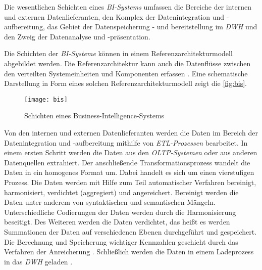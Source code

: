 Die wesentlichen Schichten eines \textit{\acrshort{BI}-Systems} umfassen die Bereiche der internen und externen Datenlieferanten, den Komplex der Datenintegration und -aufbereitung, 
das Gebiet der Datenspeicherung - und bereitstellung im \textit{\acrlong{DWH}} und den Zweig der Datenanalyse und -präsentation\cites[vgl.][126 ff.]{linden_geschaftsmodellbasierte_2016}[vgl.][8]{kemper_business_2010}. 

Die Schichten der \textit{\acrshort{BI}-Systeme} können in einem Referenzarchitekturmodell abgebildet werden. 
Die Referenzarchitektur kann auch die Datenflüsse zwischen den verteilten Systemeinheiten und Komponenten erfassen \cite[vgl.][126 ff.]{linden_geschaftsmodellbasierte_2016}.
Eine schematische Darstellung in Form eines solchen Referenzarchitekturmodell zeigt die \autoref{fig:bis}.

\begin{figure}[h]
    \centering
        \texttt{[image: bis]}
        \caption{Schichten eines Business-Intelligence-Systems}
        \label{fig:bis}
\end{figure}

Von den internen und externen Datenlieferanten werden die Daten im Bereich der Datenintegration und -aufbereitung mithilfe von \textit{\acrshort{ETL}-Prozessen} bearbeitet. 
In einem ersten Schritt werden die Daten aus den \textit{\acrshort{OLTP}-Systemen} oder aus anderen Datenquellen extrahiert. 
Der anschließende Transformationsprozess wandelt die Daten in ein homogenes Format um. Dabei handelt es sich um einen vierstufigen Prozess. Die Daten werden mit Hilfe 
zum Teil automatischer Verfahren bereinigt, harmonisiert, verdichtet (aggregiert) und angereichert.
Bereinigt werden die Daten unter anderem von syntaktischen und semantischen Mängeln. Unterschiedliche Codierungen der Daten werden durch die Harmonisierung 
beseitigt. Des Weiteren werden die Daten verdichtet, das heißt es werden Summationen der Daten auf verschiedenen Ebenen durchgeführt und gespeichert. 
Die Berechnung und Speicherung wichtiger Kennzahlen geschieht durch das Verfahren der Anreicherung \cites[vgl.][86]{gronwald_integrierte_2020}[vgl.][277 f.]{abts_grundkurs_2017}.
Schließlich werden die Daten in einem Ladeprozess in das \textit{\acrlong{DWH}} geladen \cite[vgl.][129 ff.]{linden_geschaftsmodellbasierte_2016}. 

